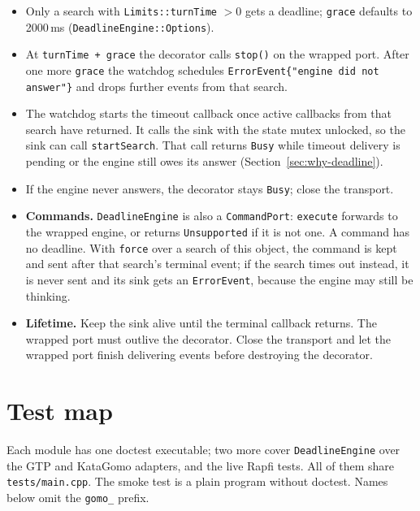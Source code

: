 \documentclass[11pt,a4paper]{article}
\newcommand{\code}[1]{\texttt{#1}}
\newcommand{\file}[1]{\texttt{#1}}
\begin{document}
\begin{itemize}
  \item Only a search with \code{Limits::turnTime} $> 0$ gets a deadline; \code{grace} defaults to
        2000\,ms (\code{DeadlineEngine::Options}).
  \item At \code{turnTime + grace} the decorator calls \code{stop()} on the wrapped port. After one
        more \code{grace} the watchdog schedules \code{ErrorEvent\{"engine did not answer"\}}
        and drops further events from that search.
  \item The watchdog starts the timeout callback once active callbacks from that search have
        returned. It calls the sink with the state mutex unlocked, so the sink can call
        \code{startSearch}. That call returns \code{Busy} while timeout delivery is pending or
        the engine still owes its answer (Section~\ref{sec:why-deadline}).
  \item If the engine never answers, the decorator stays \code{Busy}; close the transport.
  \item \textbf{Commands.} \code{DeadlineEngine} is also a \code{CommandPort}: \code{execute}
        forwards to the wrapped engine, or returns \code{Unsupported} if it is not one. A command
        has no deadline. With \code{force} over a search of this object, the command is kept and
        sent after that search's terminal event; if the search times out instead, it is never sent
        and its sink gets an \code{ErrorEvent}, because the engine may still be thinking.
  \item \textbf{Lifetime.} Keep the sink alive until the terminal callback returns. The wrapped
        port must outlive the decorator. Close the transport and let the wrapped port finish
        delivering events before destroying the decorator.
\end{itemize}

\section{Test map}\label{sec:testmap}

Each module has one doctest executable; two more cover \code{DeadlineEngine} over the GTP and
KataGomo adapters, and the live Rapfi tests. All of them share \file{tests/main.cpp}. The smoke
test is a plain program without doctest. Names below omit the \code{gomo\_} prefix.
\end{document}
